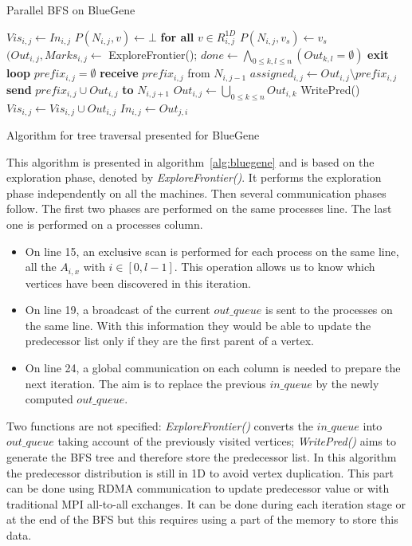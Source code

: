 \begin{algorithm}
\caption{Parallel BFS on BlueGene}\label{alg:bfs_bluegene}
\begin{algorithmic}[1]
\State $Vis_{i,j} \gets In_{i,j}$
\State $P(N_{i,j},v) \gets \bot$ \textbf{for all} $v \in R_{i,j}^{1D}$
\State $P(N_{i,j},v_s) \gets v_s$
\EndIf
{}
	\State$(Out_{i,j},Marks_{i,j} \gets $ ExploreFrontier();
	\State $done \gets \bigwedge\limits_{0 \leq k, l \leq n} (Out_{k,l} = \emptyset)$
		\State \textbf{exit loop}
	\EndIf
		\State $prefix_{i,j} = \emptyset$
	\Else 
		\State \textbf{receive} $prefix_{i,j}$ from $N_{i,j-1}$
	\EndIf
	\State $assigned_{i,j} \gets Out_{i,j} \setminus prefix_{i,j}$
		\State \textbf{send} $prefix_{i,j} \cup Out_{i,j}$ \textbf{to} $N_{i,j+1}$
	\EndIf
	\State $Out_{i,j} \gets \bigcup\limits_{0 \leq k \leq n} Out_{i,k}$
	\State WritePred()
	\State $Vis_{i,j} \gets Vis_{i,j} \cup Out_{i,j}$
	\State $In_{i,j} \gets Out_{j,i}$
\EndWhile
\end{algorithmic}
\caption{Algorithm for tree traversal presented for BlueGene}
\label{alg:bluegene}
\end{algorithm}

This algorithm is presented in algorithm~\ref{alg:bluegene} and is based on the exploration phase, denoted by \textit{ExploreFrontier()}. It performs the exploration phase independently on all the machines.
Then several communication phases follow. 
The first two phases are performed on the same processes line. The last one is performed on a processes column. 
\begin{itemize}
	\item On line 15, an exclusive scan is performed for each process on the same line, all the $A_{i,x}$ with $i \in [0,l-1]$. 
	This operation allows us to know which vertices have been discovered in this iteration.
	\item On line  19, a broadcast of the current $out\_queue$ is sent to the processes on the same line. With this information they would be able to update the predecessor list only if they are the first parent of a vertex.
	\item On line 24, a global communication on each column is needed to prepare the next iteration. 
	The aim is to replace the previous $in\_queue$ by the newly computed $out\_queue$.
\end{itemize}

Two functions are not specified: 
\textit{ExploreFrontier()} converts the $in\_queue$ into $out\_queue$ taking account of the previously visited vertices;
\textit{WritePred()} aims to generate the BFS tree and therefore store the predecessor list. In this algorithm the predecessor distribution is still in 1D to avoid vertex duplication. 
	This part can be done using RDMA communication to update predecessor value or with traditional MPI all-to-all exchanges.
	It can be done during each iteration stage or at the end of the BFS but this requires using a part of the memory to store this data. 

